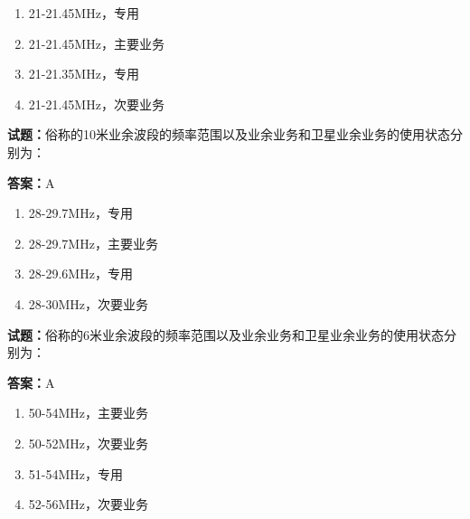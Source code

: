 \documentclass{ctexbook}
\begin{document}
\begin{enumerate}[leftmargin=3em]
  \item 21-21.45MHz，专用 

  \item 21-21.45MHz，主要业务 

  \item 21-21.35MHz，专用 


  \item 21-21.45MHz，次要业务 

\end{enumerate}





\vspace{1em}

\textbf{试题：}俗称的10米业余波段的频率范围以及业余业务和卫星业余业务的使用状态分别为： 

\textbf{答案：}A 

\begin{enumerate}[leftmargin=3em]
  \item 28-29.7MHz，专用 

  \item 28-29.7MHz，主要业务 

  \item 28-29.6MHz，专用 

  \item 28-30MHz，次要业务 

\end{enumerate}





\vspace{1em}

\textbf{试题：}俗称的6米业余波段的频率范围以及业余业务和卫星业余业务的使用状态分别为： 

\textbf{答案：}A 

\begin{enumerate}[leftmargin=3em]
  \item 50-54MHz，主要业务 

  \item 50-52MHz，次要业务 

  \item 51-54MHz，专用 

  \item 52-56MHz，次要业务 

\end{enumerate}
\end{document}
